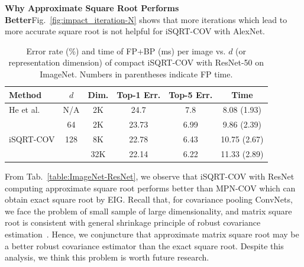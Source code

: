 \documentclass[10pt,twocolumn,letterpaper]{article}
\begin{document}

\vspace{4pt}\noindent\textbf{Why Approximate Square Root Performs Better}\quad  Fig.~\ref{fig:impact_iteration-N} shows that  more iterations which lead to more accurate square root is not helpful for  iSQRT-COV with AlexNet. 
\begin{table}[thb]
	\setlength\tabcolsep{4pt}
	\renewcommand{\baselinestretch}{1.05}
	\footnotesize
	\centering
	\begin{minipage}[t]{1.0\linewidth}
		\centering
		\begin{tabular}{|l|c|c|c|c|c|}
			\hline
			Method  & $d$ & Dim. & Top-1 Err.   &  Top-5 Err. & Time \\
			\hline
			\hline
			He et al.~\cite{He_2016_CVPR}  & N/A & 2K& 24.7 &  7.8 & 8.08 (1.93) \\
			\hline
			\multirow{3}{*}{iSQRT-COV}   & 64 & 2K    & 23.73   & 6.99 &  9.86 (2.39) \\
			&  128 & 8K        & 22.78  & 6.43  & 10.75 (2.67)\\
			&  \;256\; & 32K       & 22.14  & 6.22 & 11.33 (2.89)\\
			\hline
		\end{tabular}
	\end{minipage}
	\renewcommand{\baselinestretch}{1.0}
	\caption{Error rate (\%) and time of FP+BP (ms) per image vs. $d$ (or representation  dimension) of compact  iSQRT-COV with ResNet-50  on ImageNet. Numbers in parentheses indicate FP time.  }
	\label{table:compact-iSQRT-COV}
\end{table}
From Tab.~\ref{table:ImageNet-ResNet}, we observe that iSQRT-COV with ResNet computing approximate square root performs better than MPN-COV which can obtain exact square root by EIG. Recall that, for covariance pooling ConvNets, we face the problem of small sample of large dimensionality,  and matrix square root is consistent with general shrinkage principle of robust covariance estimation~\cite{Li_2017_ICCV}. Hence,  we conjuncture that approximate  matrix square root  may be a better robust covariance estimator than the exact square root. Despite this analysis, we think this  problem is  worth future research.
\end{document}

